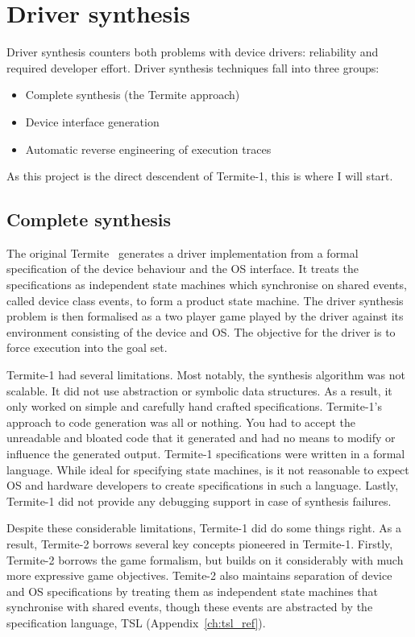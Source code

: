 \section{Driver synthesis}

Driver synthesis counters both problems with device drivers: reliability and required developer effort. Driver synthesis techniques fall into three groups:
\begin{itemize}
    \item Complete synthesis (the Termite approach)
    \item Device interface generation
    \item Automatic reverse engineering of execution traces
\end{itemize}

As this project is the direct descendent of Termite-1, this is where I will start.

\subsection{Complete synthesis}

The original Termite~\cite{Ryzhyk_CKSH_09} generates a driver implementation from a formal specification of the device behaviour and the OS interface. It treats the specifications as independent state machines which synchronise on shared events, called device class events, to form a product state machine. The driver synthesis problem is then formalised as a two player game played by the driver against its environment consisting of the device and OS. The objective for the driver is to force execution into the goal set. 

Termite-1 had several limitations. Most notably, the synthesis algorithm was not scalable. It did not use abstraction or symbolic data structures. As a result, it only worked on simple and carefully hand crafted specifications. Termite-1's approach to code generation was all or nothing. You had to accept the unreadable and bloated code that it generated and had no means to modify or influence the generated output. Termite-1 specifications were written in a formal language. While ideal for specifying state machines, is it not reasonable to expect OS and hardware developers to create specifications in such a language. Lastly, Termite-1 did not provide any debugging support in case of synthesis failures.

Despite these considerable limitations, Termite-1 did do some things right. As a result, Termite-2 borrows several key concepts pioneered in Termite-1. Firstly, Termite-2 borrows the game formalism, but builds on it considerably with much more expressive game objectives. Temite-2 also maintains separation of device and OS specifications by treating them as independent state machines that synchronise with shared events, though these events are abstracted by the specification language, TSL (Appendix~\ref{ch:tsl_ref}).

